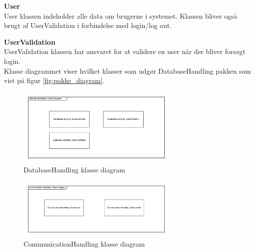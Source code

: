 \textbf{User}\\
User klassen indeholder alle data om brugerne i systemet. Klassen bliver også brugt af UserValidation i forbindelse med login/log out.

\textbf{UserValidation}\\
UserValidation klassen har ansvaret for at validere en user når der bliver forsøgt login.\\


Klasse diagrammet viser hvilket klasser som udgør DatabaseHandling pakken som vist på figur \ref{fig:pakke_diagram}.

\vspace{-5pt}
\begin{figure}[H]
	\centering
	\includegraphics[width=0.7\textwidth]{Billeder/klasse_diagrammer/DatabaseHandling.png}
	\vspace{-5pt}
	\caption{DatabaseHandling klasse diagram}
	\label{fig:DatabaseHandling_klasse_diagram}
\end{figure}

\vspace{-5pt}
\begin{figure}[H]
	\centering
	\includegraphics[width=0.7\textwidth]{Billeder/klasse_diagrammer/CommunicationHandling.png}
	\vspace{-5pt}
	\caption{CommunicationHandling klasse diagram}
	\label{fig:CommunicationHandling_klasse_diagram}
\end{figure}